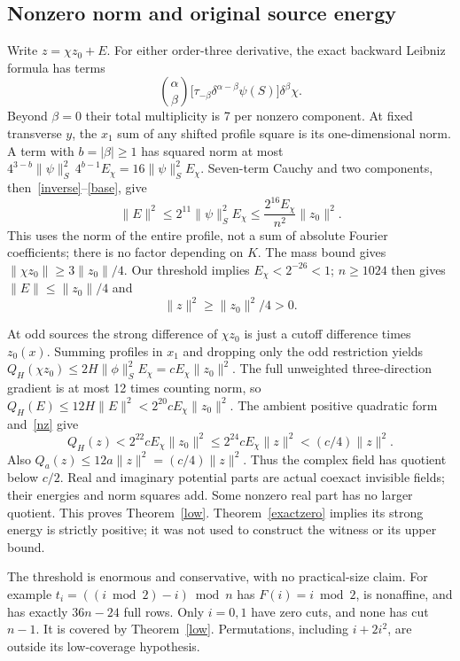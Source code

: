 \documentclass[11pt,a4paper]{article}
\newcommand{\norm}[1]{\lVert#1\rVert}
\begin{document}
\subsection{Nonzero norm and original source energy}
Write $z=\chi z_0+E$. For either order-three derivative, the exact backward
Leibniz formula has terms
\[
 \binom\alpha\beta\bigl[\tau_{-\beta}
       \delta^{\alpha-\beta}\psi(S)\bigr]\delta^\beta\chi.
\]
Beyond $\beta=0$ their total multiplicity is 7 per nonzero component.
At fixed transverse $y$, the $x_1$ sum of any shifted profile square is its
one-dimensional norm. A term with $b=|\beta|\geq1$ has squared norm at most
$4^{3-b}\norm\psi_S^2\,4^{b-1}E_\chi=16\norm\psi_S^2E_\chi$.
Seven-term Cauchy and two components, then~\eqref{inverse}--\eqref{base}, give
\begin{equation}\label{err}
 \norm E^2\leq2^{11}\norm\psi_S^2E_\chi
       \leq\frac{2^{16}E_\chi}{n^2}\norm{z_0}^2.
\end{equation}
This uses the norm of the entire profile, not a sum of absolute Fourier
coefficients; there is no factor depending on $K$. The mass bound gives
$\norm{\chi z_0}\geq3\norm{z_0}/4$. Our threshold implies
$E_\chi<2^{-26}<1$; $n\geq1024$ then gives $\norm E\leq\norm{z_0}/4$ and
\begin{equation}\label{nz}
 \norm z^2\geq\norm{z_0}^2/4>0.
\end{equation}

At odd sources the strong difference of $\chi z_0$ is just a cutoff
difference times $z_0(x)$. Summing profiles in $x_1$ and dropping only the
odd restriction yields
$Q_H(\chi z_0)\leq2H\norm\phi_S^2E_\chi=cE_\chi\norm{z_0}^2$.
The full unweighted three-direction gradient is at most 12 times counting
norm, so $Q_H(E)\leq12H\norm E^2<2^{20}cE_\chi\norm{z_0}^2$.
The ambient positive quadratic form and~\eqref{nz} give
\[
 Q_H(z)<2^{22}cE_\chi\norm{z_0}^2
         \leq2^{24}cE_\chi\norm z^2<(c/4)\norm z^2.
\]
Also $Q_a(z)\leq12a\norm z^2=(c/4)\norm z^2$. Thus the complex field
has quotient below $c/2$. Real and imaginary potential parts are actual
coexact invisible fields; their energies and norm squares add. Some nonzero
real part has no larger quotient. This proves Theorem~\ref{low}.
Theorem~\ref{exactzero} implies its strong energy is strictly positive;
it was not used to construct the witness or its upper bound.

The threshold is enormous and conservative, with no practical-size claim.
For example $t_i=((i\bmod2)-i)\bmod n$ has $F(i)=i\bmod2$, is nonaffine,
and has exactly $36n-24$ full rows. Only $i=0,1$ have zero cuts, and none
has cut $n-1$. It is covered by Theorem~\ref{low}. Permutations, including
$i+2i^2$, are outside its low-coverage hypothesis.
\end{document}
